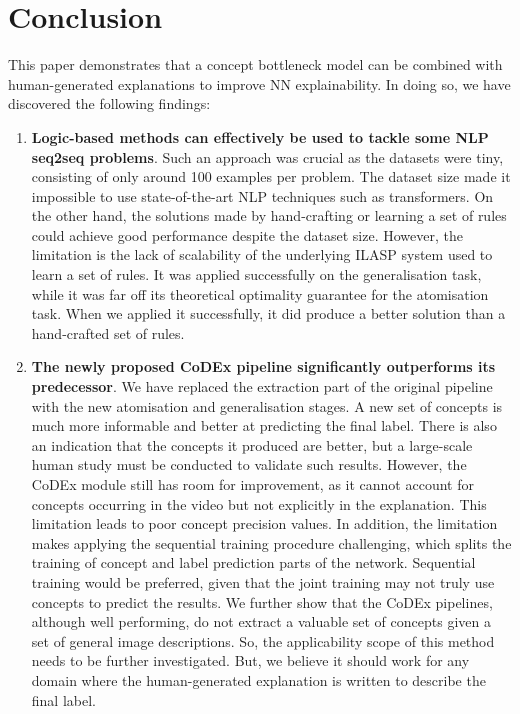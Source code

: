 
\chapter{Conclusion}

This paper demonstrates that a concept bottleneck model can be combined with human-generated explanations to improve NN explainability.
In doing so, we have discovered the following findings:
\begin{enumerate}
    \item \textbf{Logic-based methods can effectively be used to tackle some NLP seq2seq problems}.
    Such an approach was crucial as the datasets were tiny, consisting of only around 100 examples per problem.
    The dataset size made it impossible to use state-of-the-art NLP techniques such as transformers.
    On the other hand, the solutions made by hand-crafting or learning a set of rules could achieve good performance despite the dataset size.
    However, the limitation is the lack of scalability of the underlying ILASP \cite{RefWorks:RefID:54-ilasp} system used to learn a set of rules.
    It was applied successfully on the generalisation task, while it was far off its theoretical optimality guarantee for the atomisation task.
    When we applied it successfully, it did produce a better solution than a hand-crafted set of rules.
    
    
    \item \textbf{The newly proposed CoDEx pipeline significantly outperforms its predecessor}. 
    We have replaced the extraction part of the original pipeline with the new atomisation and generalisation stages.
    A new set of concepts is much more informable and better at predicting the final label.
    There is also an indication that the concepts it produced are better, but a large-scale human study must be conducted to validate such results.
    However, the CoDEx module still has room for improvement, as it cannot account for concepts occurring in the video but not explicitly in the explanation.
    This limitation leads to poor concept precision values.
    In addition, the limitation makes applying the sequential training procedure challenging, which splits the training of concept and label prediction parts of the network.
    Sequential training would be preferred, given that the joint training may not truly use concepts to predict the results.
    We further show that the CoDEx pipelines, although well performing, do not extract a valuable set of concepts given a set of general image descriptions.
    So, the applicability scope of this method needs to be further investigated. 
    But, we believe it should work for any domain where the human-generated explanation is written to describe the final label.
    

\end{enumerate}
